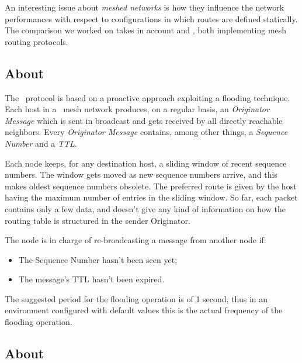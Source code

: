 An interesting issue about \emph{meshed networks} is how they influence
the network performances with respect to configurations in which routes are
defined statically. The comparison we worked on takes in account
\batman\cite{bib:BATMAN} and \olsr\cite{bib:OLSR}, both implementing mesh
routing protocols.

\subsection{About \batman}

    The \batman\ protocol is based on a proactive approach exploiting a
    flooding technique. Each host in a \batman\ mesh network produces, on a
    regular basis, an \emph{Originator Message} which is sent in
    broadcast and gets received by all directly reachable neighbors. Every
    \emph{Originator Message} contains, among other things, a
    \emph{Sequence Number} and a \emph{TTL}.

    Each node keeps, for any destination host, a sliding window of
    recent sequence numbers. The window gets moved as new sequence numbers
    arrive, and this makes oldest sequence numbers obsolete. The preferred
    route is given by the host having the maximum number of entries in the
    sliding window.  So far, each packet contains only a few data, and
    doesn't give any kind of information on how the routing table is
    structured in the sender Originator.

    The node is in charge of re-broadcasting a message from another node
    if:
    \begin{itemize}
    \item   The Sequence Number hasn't been seen yet;
    \item   The message's TTL hasn't been expired.
    \end{itemize}

    The suggested period for the flooding operation is of 1 second, thus
    in an environment configured with default values this is the actual
    frequency of the flooding operation.

\subsection{About \olsr}


